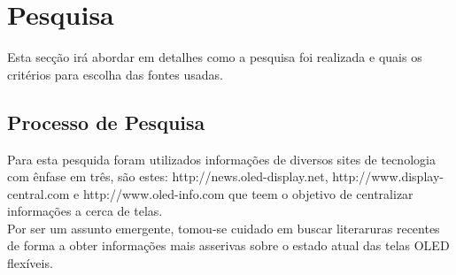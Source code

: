 \chapter{Pesquisa}
\label{cap:pesquisa}

Esta secção irá abordar em detalhes como a pesquisa foi realizada e quais os critérios para escolha das fontes usadas.


\section{Processo de Pesquisa}
\label{sec:processo de pesquisa}

Para esta pesquida foram utilizados informações de diversos sites de tecnologia com ênfase em três, são estes: http://news.oled-display.net, http://www.display-central.com e http://www.oled-info.com que teem o objetivo de centralizar informações a cerca de telas.\\

Por ser um assunto emergente, tomou-se cuidado em buscar literaruras recentes de forma a obter informações mais asserivas sobre o estado atual das telas OLED flexíveis.